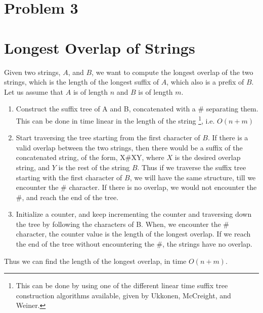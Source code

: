 \documentclass{article}
\begin{document}
\section{Problem 3}
\clearpage

\section{Longest Overlap of Strings}
Given two strings, $A$, and $B$, we want to compute the longest overlap of the two strings, which is the length of the longest suffix of $A$, which also is a prefix of $B$. Let us assume that $A$ is of length $n$ and $B$ is of length $m$.

\begin{enumerate}
\item {Construct the suffix tree of A and B, concatenated with a \# separating them. This can be done in time linear in the length of the string \footnote{This can be done by using one of the different linear time suffix tree construction algorithms available, given by Ukkonen, McCreight, and Weiner.}, i.e. $O(n+m)$ }
\item {Start traversing the tree starting from the first character of $B$. If there is a valid overlap between the two strings, then there would be a suffix of the concatenated string, of the form, X\#XY, where $X$ is the desired overlap string, and $Y$ is the rest of the string $B$. Thus if we traverse the suffix tree starting with the first character of $B$, we will have the same structure, till we encounter the \# character. If there is no overlap, we would not encounter the \#, and reach the end of the tree.}
\item {Initialize a counter, and keep incrementing the counter and traversing down the tree by following the characters of B. When, we encounter the \# character, the counter value is the length of the longest overlap. If we reach the end of the tree without encountering the \#, the strings have no overlap.} 
\end{enumerate}

Thus we can find the length of the longest overlap, in time $O(n+m)$.
\clearpage
\end{document}
